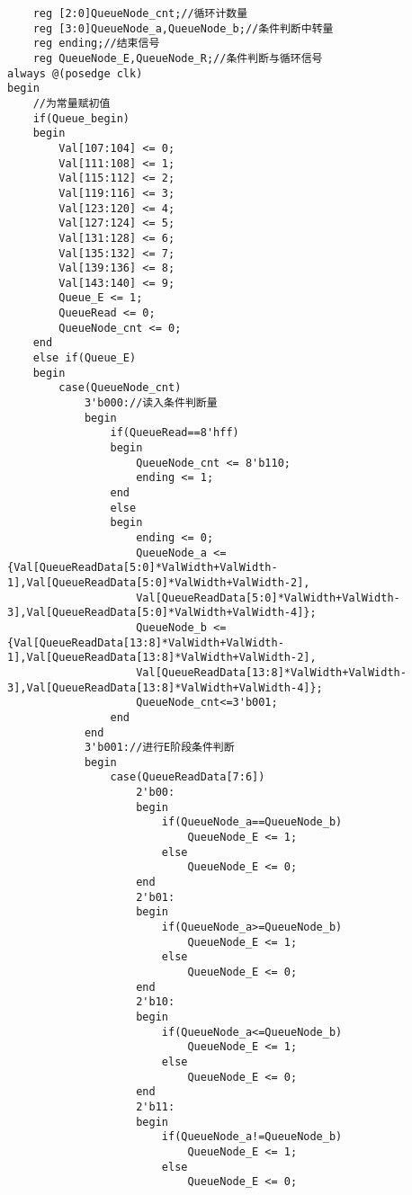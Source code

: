\documentclass[lang=cn,11pt,a4paper]{elegantpaper}
\begin{document}
\begin{lstlisting}
    reg [2:0]QueueNode_cnt;//循环计数量
    reg [3:0]QueueNode_a,QueueNode_b;//条件判断中转量
    reg ending;//结束信号
    reg QueueNode_E,QueueNode_R;//条件判断与循环信号
always @(posedge clk)
begin
    //为常量赋初值
    if(Queue_begin)
    begin
        Val[107:104] <= 0;
        Val[111:108] <= 1;
        Val[115:112] <= 2;
        Val[119:116] <= 3;
        Val[123:120] <= 4;
        Val[127:124] <= 5;
        Val[131:128] <= 6;
        Val[135:132] <= 7;
        Val[139:136] <= 8;
        Val[143:140] <= 9;
        Queue_E <= 1;
        QueueRead <= 0;
        QueueNode_cnt <= 0;
    end
    else if(Queue_E)
    begin
        case(QueueNode_cnt)
            3'b000://读入条件判断量
            begin
                if(QueueRead==8'hff)
                begin
                    QueueNode_cnt <= 8'b110;
                    ending <= 1;
                end	
                else
                begin
                    ending <= 0;
                    QueueNode_a <= {Val[QueueReadData[5:0]*ValWidth+ValWidth-1],Val[QueueReadData[5:0]*ValWidth+ValWidth-2],
                    Val[QueueReadData[5:0]*ValWidth+ValWidth-3],Val[QueueReadData[5:0]*ValWidth+ValWidth-4]};
                    QueueNode_b <= {Val[QueueReadData[13:8]*ValWidth+ValWidth-1],Val[QueueReadData[13:8]*ValWidth+ValWidth-2],
                    Val[QueueReadData[13:8]*ValWidth+ValWidth-3],Val[QueueReadData[13:8]*ValWidth+ValWidth-4]};
                    QueueNode_cnt<=3'b001;
                end
            end
            3'b001://进行E阶段条件判断
            begin
                case(QueueReadData[7:6])
                    2'b00:
                    begin
                        if(QueueNode_a==QueueNode_b)
                            QueueNode_E <= 1;
                        else
                            QueueNode_E <= 0;
                    end
                    2'b01:
                    begin
                        if(QueueNode_a>=QueueNode_b)
                            QueueNode_E <= 1;
                        else
                            QueueNode_E <= 0;
                    end
                    2'b10:
                    begin
                        if(QueueNode_a<=QueueNode_b)
                            QueueNode_E <= 1;
                        else
                            QueueNode_E <= 0;
                    end
                    2'b11:
                    begin
                        if(QueueNode_a!=QueueNode_b)
                            QueueNode_E <= 1;
                        else
                            QueueNode_E <= 0;

\end{lstlisting}
\end{document}
